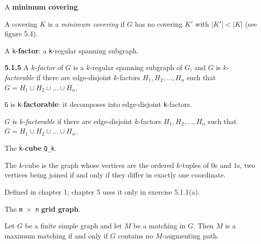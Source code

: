 \begin{definition}
\label{SimpleGraph.IsMinimumCovering}
\leanok
{}
A \textbf{minimum covering}.

A covering $K$ is a \emph{minimum covering} if $G$ has no covering $K'$ with
$|K'| < |K|$ (see figure 5.4).
\end{definition}

\begin{definition}
\label{SimpleGraph.Subgraph.IsKFactor}
\leanok
A \texttt{k}-\textbf{factor}: a \texttt{k}-regular spanning subgraph.

\textbf{5.1.5} A $k$-\emph{factor} of $G$ is a $k$-regular spanning subgraph of $G$, and
$G$ is $k$-\emph{factorable} if there are edge-disjoint $k$-factors
$H_1, H_2, \ldots, H_n$ such that $G = H_1 \cup H_2 \cup \ldots \cup H_n$.
\end{definition}

\begin{definition}
\label{SimpleGraph.IsKFactorable}
\leanok
{}
\texttt{G} is \texttt{k}-\textbf{factorable}: it decomposes into edge-disjoint \texttt{k}-factors.

$G$ is $k$-\emph{factorable} if there are edge-disjoint $k$-factors
$H_1, H_2, \ldots, H_n$ such that $G = H_1 \cup H_2 \cup \ldots \cup H_n$.
\end{definition}

\begin{definition}
\label{SimpleGraph.cube}
The \texttt{k}-\textbf{cube} \texttt{Q\_k}.

The $k$-cube is the graph whose vertices are the ordered $k$-tuples of $0$s and
$1$s, two vertices being joined if and only if they differ in exactly one
coordinate.

Defined in chapter 1; chapter 5 uses it only in exercise 5.1.1(a).
\end{definition}

\begin{definition}
\label{SimpleGraph.gridGraph}
The \texttt{m $\times$ n} \textbf{grid graph}.
\end{definition}

\begin{theorem}
\label{SimpleGraph.berge_maximum_matching}
Let $G$ be a finite simple graph and let $M$ be a matching in $G$. Then $M$ is a maximum
matching if and only if $G$ contains no $M$-augmenting path.
\end{theorem}

